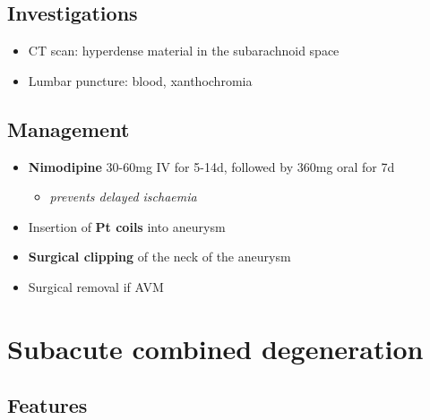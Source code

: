 \documentclass[
  12pt,
]{memoir}
\providecommand{\tightlist}{%
  \setlength{\itemsep}{0pt}\setlength{\parskip}{0pt}}
\begin{document}
\hypertarget{investigations-4}{%
\subsection{Investigations}\label{investigations-4}}

\begin{itemize}
\tightlist
\item
  CT scan: hyperdense material in the subarachnoid space
\item
  Lumbar puncture: blood, xanthochromia
\end{itemize}

\hypertarget{management-6}{%
\subsection{Management}\label{management-6}}

\begin{itemize}
\tightlist
\item
  \textbf{Nimodipine} 30-60mg IV for 5-14d, followed by 360mg oral for
  7d

  \begin{itemize}
  \tightlist
  \item
    \emph{prevents delayed ischaemia}
  \end{itemize}
\item
  Insertion of \textbf{Pt coils} into aneurysm
\item
  \textbf{Surgical clipping} of the neck of the aneurysm
\item
  Surgical removal if AVM
\end{itemize}

\hypertarget{subacute-combined-degeneration}{%
\section{Subacute combined
degeneration}\label{subacute-combined-degeneration}}

\hypertarget{features-7}{%
\subsection{Features}\label{features-7}}
\end{document}
